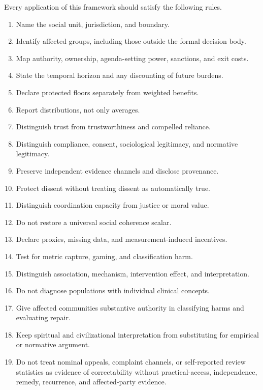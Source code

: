 \documentclass[
  11pt,
]{article}
\providecommand{\tightlist}{%
  \setlength{\itemsep}{0pt}\setlength{\parskip}{0pt}}
\begin{document}
Every application of this framework should satisfy the following rules.

\begin{enumerate}
\def\labelenumi{\arabic{enumi}.}
\tightlist
\item
  Name the social unit, jurisdiction, and boundary.
\item
  Identify affected groups, including those outside the formal decision
  body.
\item
  Map authority, ownership, agenda-setting power, sanctions, and exit
  costs.
\item
  State the temporal horizon and any discounting of future burdens.
\item
  Declare protected floors separately from weighted benefits.
\item
  Report distributions, not only averages.
\item
  Distinguish trust from trustworthiness and compelled reliance.
\item
  Distinguish compliance, consent, sociological legitimacy, and
  normative legitimacy.
\item
  Preserve independent evidence channels and disclose provenance.
\item
  Protect dissent without treating dissent as automatically true.
\item
  Distinguish coordination capacity from justice or moral value.
\item
  Do not restore a universal social coherence scalar.
\item
  Declare proxies, missing data, and measurement-induced incentives.
\item
  Test for metric capture, gaming, and classification harm.
\item
  Distinguish association, mechanism, intervention effect, and
  interpretation.
\item
  Do not diagnose populations with individual clinical concepts.
\item
  Give affected communities substantive authority in classifying harms
  and evaluating repair.
\item
  Keep spiritual and civilizational interpretation from substituting for
  empirical or normative argument.
\item
  Do not treat nominal appeals, complaint channels, or self-reported
  review statistics as evidence of correctability without
  practical-access, independence, remedy, recurrence, and affected-party
  evidence.
\end{enumerate}
\end{document}
